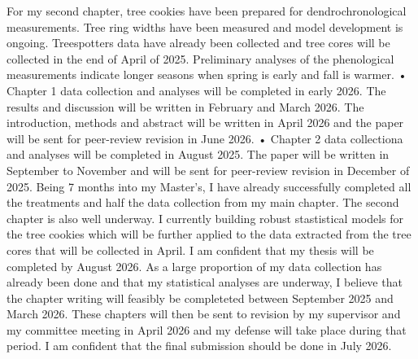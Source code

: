 \documentclass[11pt,letter]{article}
\begin{document}
For my second chapter, tree cookies have been prepared for dendrochronological measurements. Tree ring widths have been measured and model development is ongoing. Treespotters data have already been collected and tree cores will be collected in the end of April of 2025. Preliminary analyses of the phenological measurements indicate longer seasons when spring is early and fall is warmer.  
• Chapter 1 data collection and analyses will be completed in early 2026. The results and discussion will be written in February and March 2026. The introduction, methods and abstract will be written in April 2026 and the paper will be sent for peer-review revision in June 2026.
• Chapter 2 data collectiona and analyses will be completed in August 2025. The paper will be written in September to November and will be sent for peer-review revision in December of 2025.
Being 7 months into my Master’s, I have already successfully completed all the treatments and half the data collection from my main chapter. The second chapter is also well underway. I currently building robust stastistical models for the tree cookies which will be further applied to the data extracted from the tree cores that will be collected in April.
I am confident that my thesis will be completed by August 2026. As a large proportion of my data collection has already been done and that my statistical analyses are underway, I believe that the chapter writing will feasibly be completeted between September 2025 and March 2026. These chapters will then be sent to revision by my supervisor and my committee meeting in April 2026 and my defense will take place during that period. I am confident that the final submission should be done in July 2026.

\end{document}
